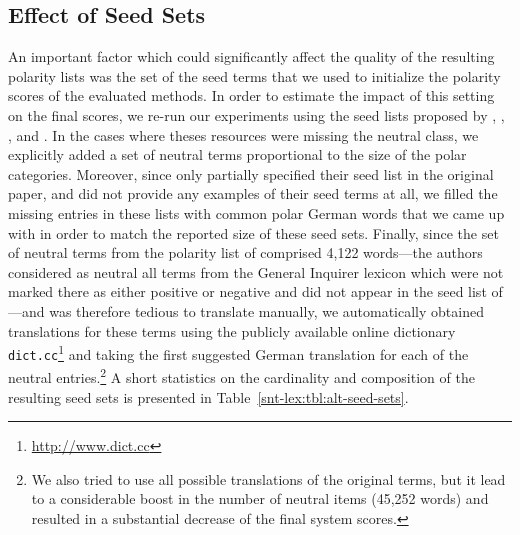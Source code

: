 
\subsection{Effect of Seed Sets}\label{subsec:snt-lex:eoss}

An important factor which could significantly affect the quality of
the resulting polarity lists was the set of the seed terms that we
used to initialize the polarity scores of the evaluated methods.  In
order to estimate the impact of this setting on the final scores, we
re-run our experiments using the seed lists proposed by \citet{Hu:04},
\citet{Kim:04}, \citet{Esuli:06c}, and \citet{Remus:10}.  In the cases
where theses resources were missing the neutral class, we explicitly
added a set of neutral terms proportional to the size of the polar
categories.  Moreover, since \citet{Hu:04} only partially specified
their seed list in the original paper, and \citet{Kim:04} did not
provide any examples of their seed terms at all, we filled the missing
entries in these lists with common polar German words that we came up
with in order to match the reported size of these seed sets.  Finally,
since the set of neutral terms from the polarity list of
\citet{Esuli:06c} comprised 4,122 words---the authors considered as
neutral all terms from the General Inquirer lexicon \cite{Stone:66}
which were not marked there as either positive or negative and did not
appear in the seed list of \citet{Turney:03}---and was therefore
tedious to translate manually, we automatically obtained translations
for these terms using the publicly available online dictionary
\texttt{dict.cc}\footnote{\url{http://www.dict.cc}} and taking the
first suggested German translation for each of the neutral
entries.\footnote{We also tried to use all possible translations of
  the original terms, but it lead to a considerable boost in the
  number of neutral items (45,252 words) and resulted in a substantial
  decrease of the final system scores.} A short statistics on the
cardinality and composition of the resulting seed sets is presented in
Table~\ref{snt-lex:tbl:alt-seed-sets}.

